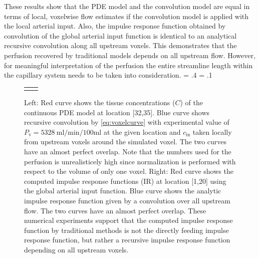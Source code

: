 \documentclass[aps,prb,article,groupedaddress,showkeys]{revtex4}
\begin{document}
These results show that the PDE model and the convolution model are equal in terms of local, voxelwise flow estimates if the convolution model is applied with the local arterial input. 
Also, the impulse response function obtained by convolution of the global arterial input function is identical to an analytical recursive convolution along all upstream voxels. 
This demonstrates that the perfusion recovered by traditional models depends on all upstream flow.
However, for meaningful interpretation of the perfusion the entire streamline length within the capillary system needs to be taken into consideration.
	\fwd = .4\textwidth
	\fht = .1\textheight	
	\begin{figure}
		{
		\small
		\begin{tabular}{c c}
			 & \\
		\end{tabular}
		}
		\caption{Left: Red curve shows the tissue concentrations ($C$) of the continuous PDE model at location [32,35]. Blue curve shows recursive convolution by \eqref{eq:voxelcurve} with experimental value of $P_{\mathrm{v}}=\SI{5328}{\milli\litre\per\minute\per100\milli\litre}$ at the given location and $c_{\mathrm{in}}$ taken locally from upstream voxels around the simulated voxel. The two curves have an almost perfect overlap. Note that the numbers used for the perfusion is unrealisticely high since normalization is performed with respect to the volume of only one voxel. Right: Red curve shows the computed impulse response functions (IR) at location [1,20] using the global arterial input function. Blue curve shows the analytic impulse response function given by a convolution over all upstream flow. The two curves have an almost perfect overlap. These numerical experiments support that the computed impulse response function by traditional methods is not the directly feeding impulse response function, but rather a recursive impulse response function depending on all upstream voxels.}\label{fig:VoxelComp}
	\end{figure}


\end{document}
